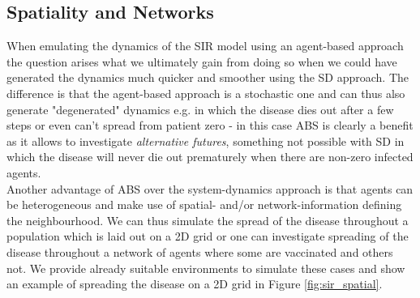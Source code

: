 \subsection{Spatiality and Networks}
When emulating the dynamics of the SIR model using an agent-based approach the question arises what we ultimately gain from doing so when we could have generated the dynamics much quicker and smoother using the SD approach. The difference is that the agent-based approach is a stochastic one and can thus also generate "degenerated" dynamics e.g. in which the disease dies out after a few steps or even can't spread from patient zero - in this case ABS is clearly a benefit as it allows to investigate \textit{alternative futures}, something not possible with SD in which the disease will never die out prematurely when there are non-zero infected agents. \\
Another advantage of ABS over the system-dynamics approach is that agents can be heterogeneous and make use of spatial- and/or network-information defining the neighbourhood. We can thus simulate the spread of the disease throughout a population which is laid out on a 2D grid or one can investigate spreading of the disease throughout a network of agents where some are vaccinated and others not. We provide already suitable environments to simulate these cases and show an example of spreading the disease on a 2D grid in Figure \ref{fig:sir_spatial}.  

